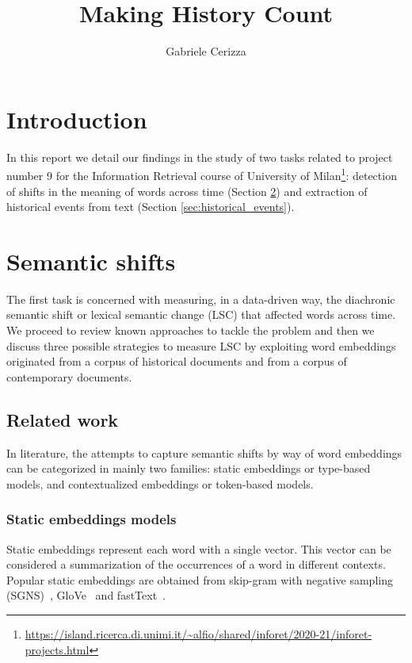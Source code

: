 \documentclass[runningheads]{llncs}
\begin{document}
\title{
    Making History Count
}
\author{Gabriele Cerizza}


\maketitle

\section{Introduction}
\label{sec:introduction}

In this report we detail our findings in the study of two tasks related to project number 9 for the Information Retrieval course of University of Milan\footnote{\url{https://island.ricerca.di.unimi.it/\~alfio/shared/inforet/2020-21/inforet-projects.html}}: detection of shifts in the meaning of words across time (Section \ref{sec:semantic_shifts}) and extraction of historical events from text (Section \ref{sec:historical_events}).

\section{Semantic shifts}
\label{sec:semantic_shifts}

The first task is concerned with measuring, in a data-driven way, the diachronic semantic shift or lexical semantic change (LSC) that affected words across time. We proceed to review known approaches to tackle the problem and then we discuss three possible strategies to measure LSC by exploiting word embeddings originated from a corpus of historical documents and from a corpus of contemporary documents.

\subsection{Related work}
\label{subsec:semantic_shifts:related_work}

In literature, the attempts to capture semantic shifts by way of word embeddings can be categorized in mainly two families: static embeddings or type-based models, and contextualized embeddings or token-based models.

\subsubsection{Static embeddings models} Static embeddings represent each word with a single vector. This vector can be considered a summarization of the occurrences of a word in different contexts. Popular static embeddings are obtained from skip-gram with negative sampling (SGNS)~\cite{mikolov-etal-2013-word2vec}, GloVe~\cite{pennington-etal-2014-glove} and fastText~\cite{bojanowski-etal-2017-fasttext}.
\end{document}
